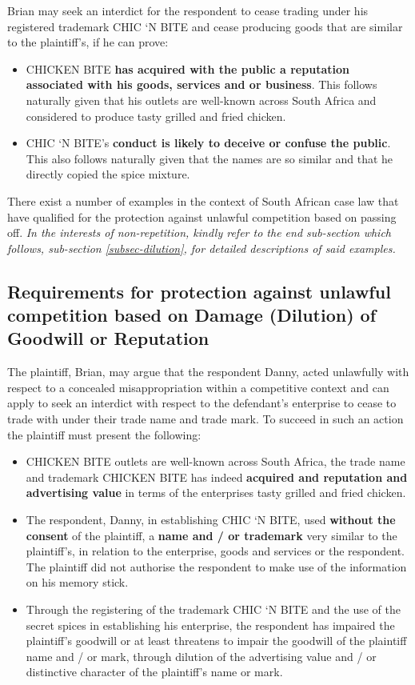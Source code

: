 \documentclass[11pt]{article}
\begin{document}
Brian may seek an interdict for the respondent to cease trading under his
registered trademark CHIC `N BITE and cease producing goods that are similar to
the plaintiff's, if he can prove:
\begin{itemize}
\item CHICKEN BITE \textbf{has acquired with the public a reputation associated
with his goods, services and or business}. This follows naturally given that
his outlets are well-known across South Africa and considered to produce tasty
grilled and fried chicken.
\item CHIC `N BITE's \textbf{conduct is likely to deceive or confuse the public}. This also
follows naturally given that the names are so similar and that he directly
copied the spice mixture.
\end{itemize}

There exist a number of examples in the context of South African case law that have
qualified for the protection against unlawful competition based on passing
off. \emph{In the interests of non-repetition, kindly refer to the end sub-section which follows, sub-section \ref{subsec-dilution}, for detailed descriptions of said examples.}

\subsection{Requirements for protection against unlawful competition based on Damage (Dilution) of Goodwill or Reputation}
\label{sec:org8b12362}
\label{subsec-dilution}

The plaintiff, Brian, may argue that the respondent Danny, acted unlawfully with
respect to a concealed misappropriation within a competitive context and can
apply to seek an interdict with respect to the defendant's enterprise
to cease to trade with under their trade name and trade mark. To succeed in
such an action the plaintiff must present the following:
\begin{itemize}
\item CHICKEN BITE outlets are well-known across South Africa, the trade name and
trademark CHICKEN BITE has indeed \textbf{acquired and reputation and advertising
value} in terms of the enterprises tasty grilled and fried chicken.
\item The respondent, Danny, in establishing CHIC `N BITE, used \textbf{without the consent}
of the plaintiff, a \textbf{name and / or trademark} very similar to the plaintiff's,
in relation to the enterprise, goods and services or the respondent. The
plaintiff did not authorise the respondent to make use of the information on
his memory stick.
\item Through the registering of the trademark CHIC `N BITE and the use of the
secret spices in establishing his enterprise, the respondent has impaired the
plaintiff's goodwill or at least threatens to impair the goodwill of the
plaintiff name and / or mark, through dilution of the advertising value and /
or distinctive character of the plaintiff's name or mark.
\end{itemize}
\end{document}

